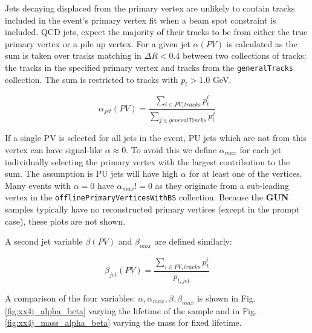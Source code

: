 Jets decaying displaced from the primary vertex are unlikely to contain tracks 
included in the event's primary vertex fit when a beam spot constraint is included.
QCD jets, expect the majority of their tracks to be from either the true primary vertex or a pile up vertex.
For a given jet $\alpha(PV)$ is calculated as the sum is taken over tracks matching in $\Delta R< 0.4$ between two
collections of tracks: the tracks in the specified primary vertex and tracks from the \texttt{generalTracks} collection. 
The sum is restricted to tracks with $p_{t} > 1.0$ GeV. 

\begin{equation}
\alpha_{jet}(PV) = \frac{\sum_{i\in PV,tracks} p_{t}^i}{ \sum_{j\in generalTracks} p_{t}^j }
\end{equation}

If a single PV is selected for all jets in the event, PU jets which are not from this vertex can have signal-like $\alpha \approx 0$. 
To avoid this we define $\alpha_{max}$ for each jet individually selecting the primary vertex with
the largest contribution to the sum. The assumption is PU jets will have high $\alpha$ for at least one 
of the vertices. Many events with $\alpha = 0$ have $\alpha_{max} != 0$ as they originate
from a sub-leading vertex in the \texttt{offlinePrimaryVerticesWithBS} collection. 
Because the \textbf{GUN} samples typically have no reconstructed primary vertices (except in the
prompt case), these plots are not shown. 

A second jet variable $\beta(PV)$ and $\beta_{max}$ are defined similarly:

\begin{equation}
\beta_{jet}(PV) = \frac{\sum_{i \in PV,tracks} p_{t}^i}{p_{t,jet}}
\end{equation}

A comparison of the four variables: $\alpha, \alpha_{max}, \beta, \beta_{max}$ is shown in Fig. \ref{fig:xx4j_alpha_beta} varying 
the lifetime of the sample and in Fig. \ref{fig:xx4j_mass_alpha_beta} varying the mass for fixed lifetime. 

